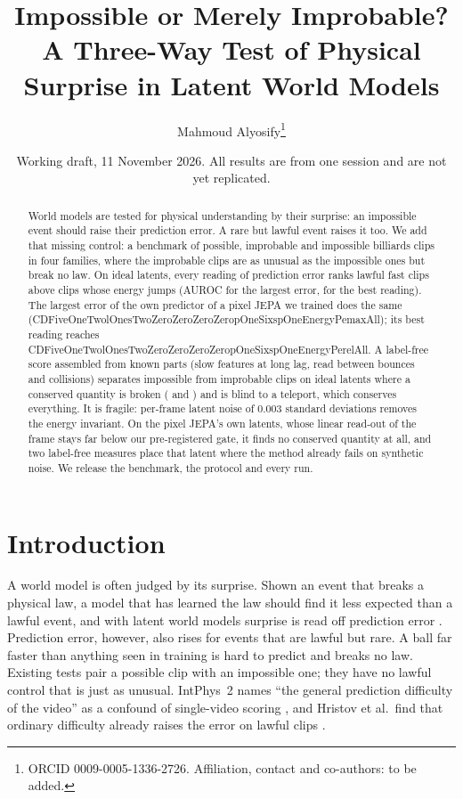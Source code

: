 \documentclass[11pt]{article}
\title{Impossible or Merely Improbable?\\
A Three-Way Test of Physical Surprise in Latent World Models}
\author{Mahmoud Alyosify\thanks{ORCID 0009-0005-1336-2726. Affiliation, contact and co-authors: to be added.}}
\date{Working draft, 11 November 2026. All results are from one session and are not yet replicated.}
\newcommand{\Cp}[1]{\csname CDFiveOneTwolOnesTwoZeroZeroZeroZeropOneSixspOne#1\endcsname}
\begin{document}
\maketitle

\begin{abstract}
World models are tested for physical understanding by their surprise: an impossible event should
raise their prediction error. A rare but lawful event raises it too. We add that missing control:
a benchmark of possible, improbable and impossible billiards clips in four families, where the
improbable clips are as unusual as the impossible ones but break no law. On ideal latents, every
reading of prediction error ranks lawful fast clips above clips whose energy jumps (AUROC
\AEnergyPemax{} for the largest error, \AEnergyPerel{} for the best reading). The largest error of the
own predictor of a pixel JEPA we trained does the same (\Cp{EnergyPemaxAll}); its best reading
reaches \Cp{EnergyPerelAll}. A
label-free score assembled from known parts (slow features at long lag, read between bounces and
collisions) separates impossible from improbable clips on ideal latents where a conserved quantity is
broken (\AEnergyInv{} and \AStochasticInv{}) and is blind to a teleport, which conserves everything.
It is fragile: per-frame latent noise of 0.003 standard deviations removes the energy invariant. On the
pixel JEPA's own latents, whose linear read-out of the frame stays far below our pre-registered
gate, it finds no conserved quantity at all, and two label-free measures place that latent where the
method already fails on synthetic noise. We release the benchmark, the protocol and every run.
\end{abstract}

\section{Introduction}

A world model is often judged by its surprise. Shown an event that breaks a physical law, a model
that has learned the law should find it less expected than a lawful event, and with latent world
models surprise is read off prediction error
\citep{maes2026lewm,bordes2025intphys2,hristov2026surprise}. Prediction error, however, also rises
for events that are lawful but rare. A ball far faster than anything seen in training is hard to
predict and breaks no law. Existing tests pair a possible clip with an impossible one; they have no
lawful control that is just as unusual. IntPhys~2 names ``the general prediction difficulty of the
video'' as a confound of single-video scoring \citep{bordes2025intphys2}, and Hristov et al.\ find
that ordinary difficulty already raises the error on lawful clips \citep{hristov2026surprise}.
\end{document}

